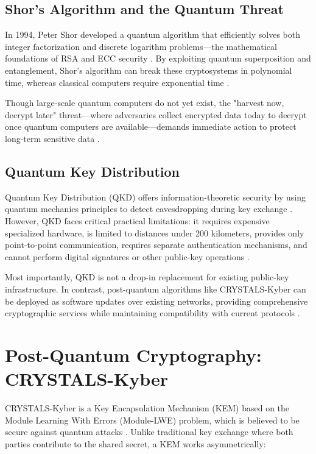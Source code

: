 \subsection{Shor's Algorithm and the Quantum Threat}

In 1994, Peter Shor developed a quantum algorithm that efficiently solves both integer factorization and discrete logarithm problems—the mathematical foundations of RSA and ECC security \cite{Shor1997}. By exploiting quantum superposition and entanglement, Shor's algorithm can break these cryptosystems in polynomial time, whereas classical computers require exponential time \cite{Nielsen2010}.

Though large-scale quantum computers do not yet exist, the "harvest now, decrypt later" threat—where adversaries collect encrypted data today to decrypt once quantum computers are available—demands immediate action to protect long-term sensitive data \cite{Mosca2018}.

\subsection{Quantum Key Distribution}

Quantum Key Distribution (QKD) offers information-theoretic security by using quantum mechanics principles to detect eavesdropping during key exchange \cite{Bennett1984}. However, QKD faces critical practical limitations: it requires expensive specialized hardware, is limited to distances under 200 kilometers, provides only point-to-point communication, requires separate authentication mechanisms, and cannot perform digital signatures or other public-key operations \cite{Diamanti2016}.

Most importantly, QKD is not a drop-in replacement for existing public-key infrastructure. In contrast, post-quantum algorithms like CRYSTALS-Kyber can be deployed as software updates over existing networks, providing comprehensive cryptographic services while maintaining compatibility with current protocols \cite{NIST-PQC}.

\section{Post-Quantum Cryptography: CRYSTALS-Kyber}

CRYSTALS-Kyber is a Key Encapsulation Mechanism (KEM) based on the Module Learning With Errors (Module-LWE) problem, which is believed to be secure against quantum attacks \cite{Peikert2016}. Unlike traditional key exchange where both parties contribute to the shared secret, a KEM works asymmetrically:

